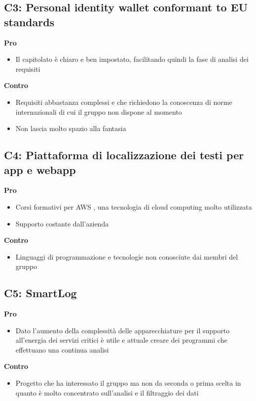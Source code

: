 \subsection{C3: Personal identity wallet conformant to EU standards}
\textbf{Pro}
\begin{itemize}[leftmargin=30pt, rightmargin=2cm]
    \item Il capitolato è chiaro e ben impostato, facilitando quindi la fase di analisi dei requisiti
\end{itemize}
\textbf{Contro}
\begin{itemize}
    \item Requisiti abbastanza complessi e che richiedono la conoscenza di norme internazionali di cui il gruppo non dispone al momento
    \item Non lascia molto spazio alla fantasia
\end{itemize}

\subsection{C4: Piattaforma di localizzazione dei testi per app e webapp}
\textbf{Pro}
\begin{itemize}[leftmargin=30pt, rightmargin=2cm]
    \item Corsi formativi per AWS , una tecnologia di cloud computing molto utilizzata
    \item Supporto costante dall'azienda
\end{itemize}
\textbf{Contro}
\begin{itemize}
    \item Linguaggi di programmazione e tecnologie non conosciute dai membri del gruppo
\end{itemize}

\subsection{C5: SmartLog}
\textbf{Pro}
\begin{itemize}[leftmargin=30pt, rightmargin=2cm]
    \item Dato l’aumento della complessità delle apparecchiature per il supporto all’energia dei servizi critici è utile e attuale creare dei programmi che effettuano una continua analisi
\end{itemize}
\textbf{Contro}
\begin{itemize}
    \item Progetto che ha interessato il gruppo ma non da seconda o prima scelta in quanto è molto concentrato sull’analisi e il filtraggio dei dati
\end{itemize}

